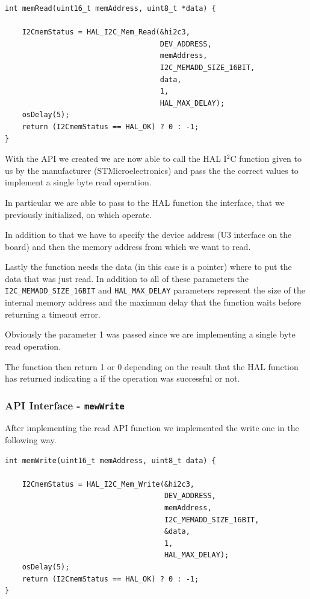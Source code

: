 \documentclass[../main.tex]{subfiles}
\begin{document}
\begin{lstlisting}
int memRead(uint16_t memAddress, uint8_t *data) {

    I2CmemStatus = HAL_I2C_Mem_Read(&hi2c3, 
    								DEV_ADDRESS,
                                 	memAddress,
                                    I2C_MEMADD_SIZE_16BIT,
                                 	data,
                                    1,
                                    HAL_MAX_DELAY);
	osDelay(5);
    return (I2CmemStatus == HAL_OK) ? 0 : -1; 
}
\end{lstlisting}

\vspace{0.5cm}

With the API we created we are now able to call the HAL I$^2$C function given to us by the manufacturer (STMicroelectronics) and pass the the correct values to implement a single byte read operation.

In particular we are able to pass to the HAL function the interface, that we previously initialized, on which operate. 

In addition to that we have to specify the device address (U3 interface on the board) and then the memory address from which we want to read. 

Lastly the function needs the data (in this case is a pointer) where to put the data that was just read. In addition to all of these parameters the \texttt{I2C\_MEMADD\_SIZE\_16BIT} and \texttt{HAL\_MAX\_DELAY} parameters represent the size of the internal memory address and the maximum delay that the function waits before returning a timeout error. 

Obviously the parameter 1 was passed since we are implementing a single byte read operation.

The function then return 1 or 0 depending on the result that the HAL function has returned indicating a if the operation was successful or not.

\subsubsection*{API Interface - \texttt{mewWrite}}

After implementing the read API function we implemented the write one in the following way.\\


\begin{lstlisting}
int memWrite(uint16_t memAddress, uint8_t data) {

    I2CmemStatus = HAL_I2C_Mem_Write(&hi2c3, 
                                     DEV_ADDRESS,
                                     memAddress,
                                     I2C_MEMADD_SIZE_16BIT,
                                     &data,
                                     1,
                                     HAL_MAX_DELAY);
	osDelay(5);
    return (I2CmemStatus == HAL_OK) ? 0 : -1;
}		
\end{lstlisting}
\end{document}
